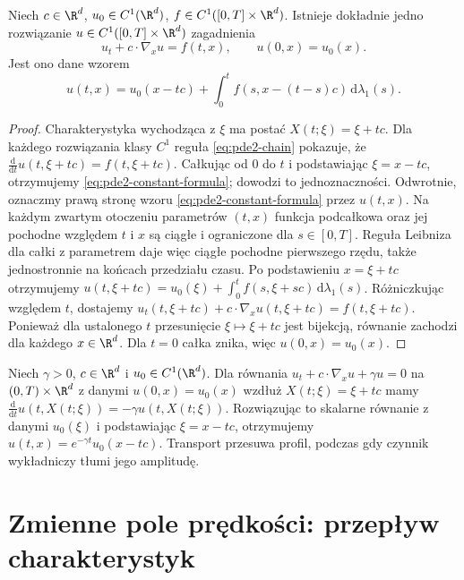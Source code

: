 \begin{stwierdzenie}
\label{prop:pde2-constant}
Niech $c\in\R^d$, $u_0\in C^1(\R^d)$,
$f\in C^1([0,T]\times\R^d)$. Istnieje dokładnie jedno
rozwiązanie $u\in C^1([0,T]\times\R^d)$ zagadnienia
\[
 u_t+c\cdot\nabla_xu=f(t,x),\qquad u(0,x)=u_0(x).
\]
Jest ono dane wzorem
\begin{equation}\label{eq:pde2-constant-formula}
 u(t,x)=u_0(x-tc)+\int_0^t f(s,x-(t-s)c)\,\mathrm d\lambda_1(s).
\end{equation}
\end{stwierdzenie}
\begin{proof}
Charakterystyka wychodząca z $\xi$ ma postać
$X(t;\xi)=\xi+tc$. Dla każdego rozwiązania klasy $C^1$
reguła \eqref{eq:pde2-chain} pokazuje, że
$\frac{\mathrm d}{\mathrm dt}u(t,\xi+tc)=f(t,\xi+tc)$.
Całkując od $0$ do $t$ i podstawiając $\xi=x-tc$,
otrzymujemy \eqref{eq:pde2-constant-formula}; dowodzi to
jednoznaczności. Odwrotnie, oznaczmy prawą stronę wzoru
\eqref{eq:pde2-constant-formula} przez $u(t,x)$.
Na każdym zwartym otoczeniu parametrów $(t,x)$ funkcja
podcałkowa oraz jej pochodne względem $t$ i $x$ są ciągłe
i ograniczone dla $s\in[0,T]$. Reguła Leibniza dla całki
z parametrem daje więc ciągłe pochodne pierwszego rzędu,
także jednostronnie na końcach przedziału czasu.
Po podstawieniu $x=\xi+tc$ otrzymujemy
$u(t,\xi+tc)=u_0(\xi)+\int_0^t f(s,\xi+sc)\,\mathrm d\lambda_1(s)$.
Różniczkując względem $t$, dostajemy
$u_t(t,\xi+tc)+c\cdot\nabla_xu(t,\xi+tc)=f(t,\xi+tc)$.
Ponieważ dla ustalonego $t$ przesunięcie $\xi\mapsto\xi+tc$
jest bijekcją, równanie zachodzi dla każdego $x\in\R^d$.
Dla $t=0$ całka znika, więc $u(0,x)=u_0(x)$.
\end{proof}

\begin{przyklad}
Niech $\gamma>0$, $c\in\R^d$ i $u_0\in C^1(\R^d)$.
Dla równania $u_t+c\cdot\nabla_xu+\gamma u=0$
na $(0,T)\times\R^d$ z danymi $u(0,x)=u_0(x)$
wzdłuż $X(t;\xi)=\xi+tc$ mamy
$\frac{\mathrm d}{\mathrm dt}u(t,X(t;\xi))
=-\gamma u(t,X(t;\xi))$.
Rozwiązując to skalarne równanie z danymi $u_0(\xi)$
i podstawiając $\xi=x-tc$, otrzymujemy
$u(t,x)=e^{-\gamma t}u_0(x-tc)$.
Transport przesuwa profil, podczas gdy czynnik wykładniczy
tłumi jego amplitudę.
\end{przyklad}

\section{Zmienne pole prędkości: przepływ charakterystyk}
\label{sec:pde2-linear}

